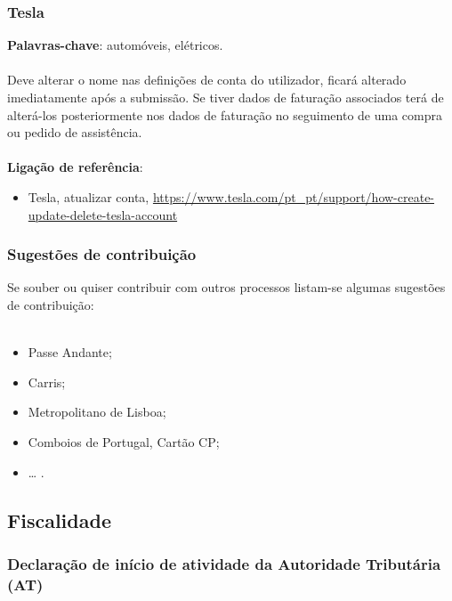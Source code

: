 \subsubsection{Tesla}

\textbf{Palavras-chave}: automóveis, elétricos. \\
\\
Deve alterar o nome nas definições de conta do utilizador, ficará
alterado imediatamente após a submissão. Se tiver dados de faturação
associados terá de alterá-los posteriormente nos dados de faturação no
seguimento de uma compra ou pedido de assistência. \\
\\
\textbf{Ligação de referência}:
\begin{itemize}
	\item Tesla, atualizar conta, \url{https://www.tesla.com/pt\_pt/support/how-create-update-delete-tesla-account}
\end{itemize}

\subsubsection{Sugestões de contribuição}

Se souber ou quiser contribuir com outros processos listam-se algumas
sugestões de contribuição: \\
\\
\begin{itemize}
	\item Passe Andante;
	\item Carris;
	\item Metropolitano de Lisboa;
	\item Comboios de Portugal, Cartão CP;
	\item \ldots{} .
\end{itemize}

\subsection{Fiscalidade}

\subsubsection{Declaração de início de atividade da Autoridade Tributária (AT)}

